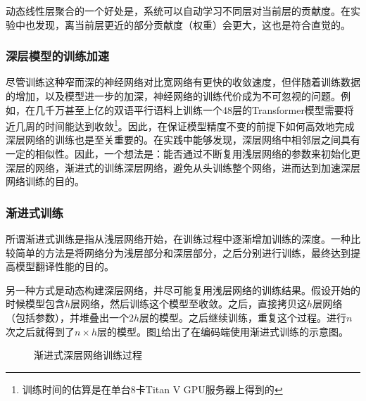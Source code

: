 \parinterval 动态线性层聚合的一个好处是，系统可以自动学习不同层对当前层的贡献度。在实验中也发现，离当前层更近的部分贡献度（权重）会更大，这也是符合直觉的。


\subsubsection{深层模型的训练加速}

\parinterval 尽管训练这种窄而深的神经网络对比宽网络有更快的收敛速度，但伴随着训练数据的增加，以及模型进一步的加深，神经网络的训练代价成为不可忽视的问题。例如，在几千万甚至上亿的双语平行语料上训练一个48层的Transformer模型需要将近几周的时间能达到收敛\footnote[14]{训练时间的估算是在单台8卡Titan V GPU服务器上得到的}。因此，在保证模型精度不变的前提下如何高效地完成深层网络的训练也是至关重要的。在实践中能够发现，深层网络中相邻层之间具有一定的相似性。因此，一个想法是：能否通过不断复用浅层网络的参数来初始化更深层的网络，渐进式的训练深层网络，避免从头训练整个网络，进而达到加速深层网络训练的目的。


\subsubsection{渐进式训练}

\parinterval 所谓渐进式训练是指从浅层网络开始，在训练过程中逐渐增加训练的深度。一种比较简单的方法是将网络分为浅层部分和深层部分，之后分别进行训练，最终达到提高模型翻译性能的目的\cite{DBLP:conf/acl/WuWXTGQLL19}。

\parinterval 另一种方式是动态构建深层网络，并尽可能复用浅层网络的训练结果。假设开始的时候模型包含$h$层网络，然后训练这个模型至收敛。之后，直接拷贝这$h$层网络（包括参数），并堆叠出一个$2h$层的模型。之后继续训练，重复这个过程。进行$n$次之后就得到了$n\times h$层的模型。图\ref{fig:7-30}给出了在编码端使用渐进式训练的示意图。

\begin{figure}[htp]
\centering

\caption{渐进式深层网络训练过程}
\label{fig:7-30}
\end{figure}

